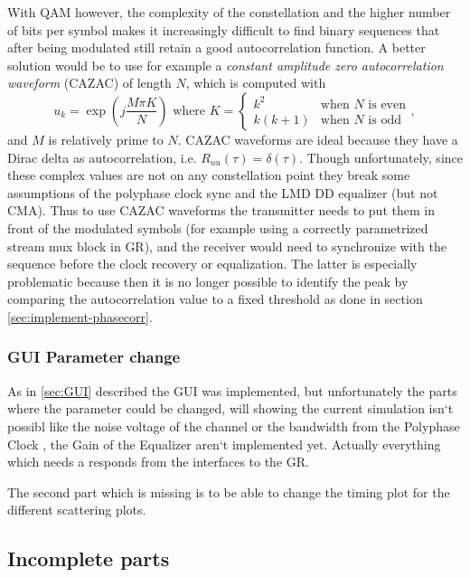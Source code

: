 With QAM however, the complexity of the constellation and the higher number of bits per symbol makes it increasingly difficult to find binary sequences that after being modulated still retain a good autocorrelation function. A better solution would be to use for example a \emph{constant amplitude zero autocorrelation waveform} (CAZAC) of length \(N\), which is computed with
\begin{equation}
	u_k = \exp\left(j\frac{M\pi K}{N}\right) \text{ where }
	K = \begin{cases}
		k^2 & \text{when } N \text{ is even} \\
		k(k+1) & \text{when } N \text{ is odd}
	\end{cases},
\end{equation}
and \(M\) is relatively prime to \(N\). CAZAC waveforms are ideal because they have a Dirac delta as autocorrelation\cite{Chu1972}, i.e. \(R_{uu}(\tau) = \delta(\tau)\). Though unfortunately, since these complex values are not on any constellation point they break some assumptions of the polyphase clock sync and the LMD DD equalizer (but not CMA). Thus to use CAZAC waveforms the transmitter needs to put them in front of the modulated symbols (for example using a correctly parametrized stream mux block in GR), and the receiver would need to synchronize with the sequence before the clock recovery or equalization. The latter is especially problematic because then it is no longer possible to identify the peak by comparing the autocorrelation value to a fixed threshold as done in section \ref{sec:implement-phasecorr}.


\subsubsection{GUI Parameter change}
As in \ref{sec:GUI} described the GUI was implemented, but unfortunately the parts where the parameter could be changed, will showing the current simulation isn`t possibl
 like the noise voltage of the channel or the bandwidth from the Polyphase Clock , the Gain of the Equalizer aren`t implemented yet. Actually everything which needs a responds from the interfaces to the GR. 

The second part which is missing is to be able to change the timing plot for the different scattering plots.

\subsection{Incomplete parts}

